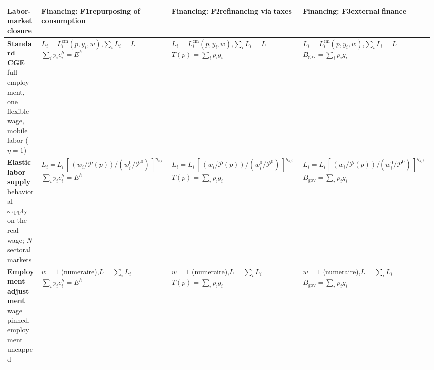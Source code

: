 \begin{table}[htbp]
\centering
\footnotesize
\setlength{\tabcolsep}{3pt}
\renewcommand{\arraystretch}{1.35}
\begin{tabular}{@{}>{\raggedright\arraybackslash}p{2.30cm}
                  >{\raggedright\arraybackslash}p{3.90cm}
                  >{\raggedright\arraybackslash}p{3.90cm}
                  >{\raggedright\arraybackslash}p{3.90cm}@{}}
\toprule
\textbf{Labor-market closure}
& \textbf{Financing: F1}\newline \scriptsize repurposing of consumption
& \textbf{Financing: F2}\newline \scriptsize refinancing via taxes
& \textbf{Financing: F3}\newline \scriptsize external finance \\
\midrule

\textbf{Standard CGE}\newline
  \scriptsize full employment, one flexible wage, mobile labor ($\eta = 1$)
& $L_i = L_i^{\mathrm{cm}}(p, y_i, w)$,\quad $\sum_i L_i = \bar L$
  \newline $\sum_i p_i c_i^{h} = E^{h}$
& $L_i = L_i^{\mathrm{cm}}(p, y_i, w)$,\quad $\sum_i L_i = \bar L$
  \newline $T(p) = \sum_i p_i g_i$
& $L_i = L_i^{\mathrm{cm}}(p, y_i, w)$,\quad $\sum_i L_i = \bar L$
  \newline $B_{\mathrm{gov}} = \sum_i p_i g_i$ \\
\midrule

\textbf{Elastic labor supply}\newline
  \scriptsize behavioral supply on the real wage; $N$ sectoral markets
& $L_i = \bar L_i\,[\,(w_i/\mathcal{P}(p))/(w_i^{0}/\mathcal{P}^{0})\,]^{\eta_{s,i}}$
  \newline $\sum_i p_i c_i^{h} = E^{h}$
& $L_i = \bar L_i\,[\,(w_i/\mathcal{P}(p))/(w_i^{0}/\mathcal{P}^{0})\,]^{\eta_{s,i}}$
  \newline $T(p) = \sum_i p_i g_i$
& $L_i = \bar L_i\,[\,(w_i/\mathcal{P}(p))/(w_i^{0}/\mathcal{P}^{0})\,]^{\eta_{s,i}}$
  \newline $B_{\mathrm{gov}} = \sum_i p_i g_i$ \\
\midrule

\textbf{Employment adjustment}\newline
  \scriptsize wage pinned, employment uncapped
& $w = 1$ (numeraire),\quad $L = \sum_i L_i$
  \newline $\sum_i p_i c_i^{h} = E^{h}$
& $w = 1$ (numeraire),\quad $L = \sum_i L_i$
  \newline $T(p) = \sum_i p_i g_i$
& $w = 1$ (numeraire),\quad $L = \sum_i L_i$
  \newline $B_{\mathrm{gov}} = \sum_i p_i g_i$ \\
\midrule


\end{tabular}
\end{table}
